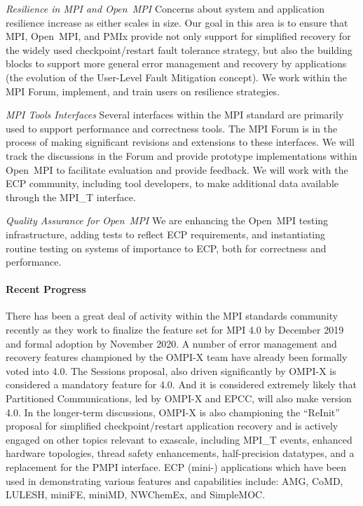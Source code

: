 \emph{Resilience in MPI and Open~MPI} Concerns about system and
application resilience increase as either scales in size.  Our goal in
this area is to ensure that MPI, Open~MPI, and PMIx provide not only
support for simplified
recovery for the widely used checkpoint/restart fault tolerance strategy, but also the building
blocks to support more general error management and recovery by applications (the evolution of the User-Level
Fault Mitigation concept). We work within the MPI Forum, implement,
and train users on resilience strategies.

\emph{MPI Tools Interfaces}  Several interfaces within the
MPI standard are primarily used to support performance and
correctness tools.
The MPI Forum is in the process
of making significant revisions and extensions to these interfaces.
We will track the discussions in the Forum and provide prototype
implementations within Open~MPI to facilitate evaluation and provide
feedback.
We will work with the
ECP community, including tool developers, to make additional data
available through the MPI\_T interface.

\emph{Quality Assurance for Open~MPI}  We are enhancing the
Open~MPI testing infrastructure, adding tests to reflect ECP
requirements, and instantiating routine testing on systems of
importance to ECP, both for correctness and performance.

\paragraph{Recent Progress}
There has been a great deal of activity within the MPI standards community recently
as they work to finalize the feature set for MPI 4.0 by December 2019 and
formal adoption by November 2020.  A number of error management and recovery features
championed by the OMPI-X team have already been formally voted into 4.0.  The Sessions proposal,
also driven significantly by OMPI-X is considered a mandatory feature for 4.0.  And it is considered extremely likely that Partitioned Communications, led by OMPI-X and EPCC, will also make version 4.0.
In the longer-term discussions, OMPI-X is also championing the ``ReInit'' proposal for simplified checkpoint/restart application recovery and is actively engaged on other topics relevant to
exascale, including MPI\_T events, enhanced hardware topologies, thread safety enhancements, half-precision datatypes, and a replacement for the PMPI interface.  ECP (mini-) applications which have been used in demonstrating various features and capabilities include: AMG, CoMD, LULESH, miniFE, miniMD, NWChemEx, and SimpleMOC.

